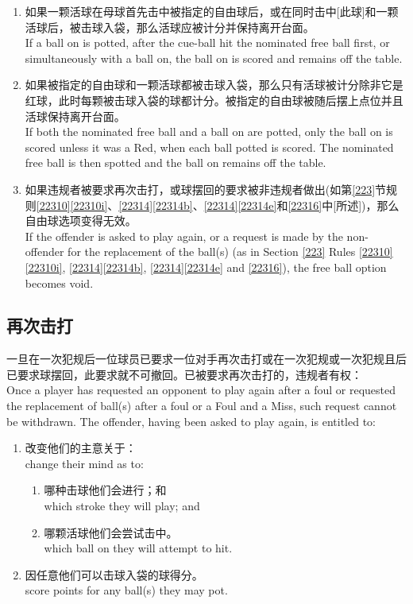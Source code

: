 \begin{enumerate}[label=(\alph*)]
    \item 如果一颗活球在母球首先击中被指定的自由球后，或在同时击中[此球]和一颗活球后，被击球入袋，那么活球应被计分并保持离开台面。\\
    If a ball on is potted, after the cue-ball hit the nominated free ball first, or simultaneously with a ball on, the ball on is scored and remains off the table.
    \item 如果被指定的自由球和一颗活球都被击球入袋，那么只有活球被计分除非它是红球，此时每颗被击球入袋的球都计分。被指定的自由球被随后摆上点位并且活球保持离开台面。\\
    If both the nominated free ball and a ball on are potted, only the ball on is scored unless it was a Red, when each ball potted is scored. The nominated free ball is then spotted and the ball on remains off the table.
    \item 如果违规者被要求再次击打，或球摆回的要求被非违规者做出(如第\ref{223}节规则\ref{22310}\ref{22310i}、\ref{22314}\ref{22314b}、\ref{22314}\ref{22314e}和\ref{22316}中[所述])，那么自由球选项变得无效。\\
    If the offender is asked to play again, or a request is made by the non-offender for the replacement of the ball(s) (as in Section \ref{223} Rules \ref{22310}\ref{22310i}, \ref{22314}\ref{22314b}, \ref{22314}\ref{22314e} and \ref{22316}), the free ball option becomes void.
\end{enumerate}

\subsection{再次击打}

\noindent 一旦在一次犯规后一位球员已要求一位对手再次击打或在一次犯规或一次犯规且\miss{}后已要求球摆回，此要求就不可撤回。已被要求再次击打的，违规者有权：\\
Once a player has requested an opponent to play again after a foul or requested the replacement of ball(s) after a foul or a Foul and a Miss, such request cannot be withdrawn. The offender, having been asked to play again, is entitled to:
\begin{enumerate}[label=(\alph*)]
    \item 改变他们的主意关于：\\
    change their mind as to:
    \begin{enumerate}[label=(\roman*)]
        \item 哪种击球他们会进行；和\\
        which stroke they will play; and
        \item 哪颗活球他们会尝试击中。\\
        which ball on they will attempt to hit.
    \end{enumerate}
    \item 因任意他们可以击球入袋的球得分。\\
    score points for any ball(s) they may pot.
\end{enumerate}

